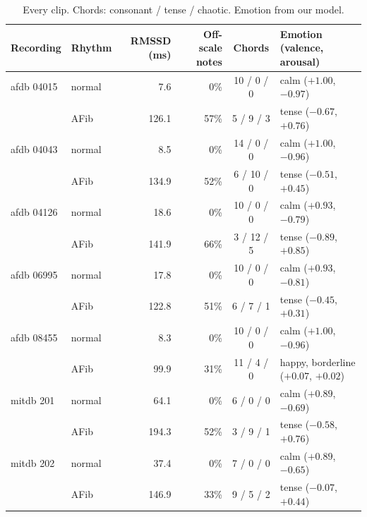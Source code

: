 \documentclass[11pt,a4paper]{article}
\begin{document}
\begin{table}[h]
\centering
\small
\setlength{\tabcolsep}{4pt}
\caption{Every clip. Chords: consonant / tense / chaotic. Emotion from our model.}
\label{tab:results}
\begin{tabular}{llrrcl}
\toprule
Recording & Rhythm & RMSSD (ms) & Off-scale notes & Chords & Emotion (valence, arousal)\\
\midrule
afdb 04015 & normal &   7.6 &  0\% & 10 / 0 / 0 & calm ($+1.00$, $-0.97$)\\
           & AFib   & 126.1 & 57\% &  5 / 9 / 3 & tense ($-0.67$, $+0.76$)\\
afdb 04043 & normal &   8.5 &  0\% & 14 / 0 / 0 & calm ($+1.00$, $-0.96$)\\
           & AFib   & 134.9 & 52\% & 6 / 10 / 0 & tense ($-0.51$, $+0.45$)\\
afdb 04126 & normal &  18.6 &  0\% & 10 / 0 / 0 & calm ($+0.93$, $-0.79$)\\
           & AFib   & 141.9 & 66\% & 3 / 12 / 5 & tense ($-0.89$, $+0.85$)\\
afdb 06995 & normal &  17.8 &  0\% & 10 / 0 / 0 & calm ($+0.93$, $-0.81$)\\
           & AFib   & 122.8 & 51\% &  6 / 7 / 1 & tense ($-0.45$, $+0.31$)\\
afdb 08455 & normal &   8.3 &  0\% & 10 / 0 / 0 & calm ($+1.00$, $-0.96$)\\
           & AFib   &  99.9 & 31\% & 11 / 4 / 0 & happy, borderline ($+0.07$, $+0.02$)\\
mitdb 201  & normal &  64.1 &  0\% &  6 / 0 / 0 & calm ($+0.89$, $-0.69$)\\
           & AFib   & 194.3 & 52\% &  3 / 9 / 1 & tense ($-0.58$, $+0.76$)\\
mitdb 202  & normal &  37.4 &  0\% &  7 / 0 / 0 & calm ($+0.89$, $-0.65$)\\
           & AFib   & 146.9 & 33\% &  9 / 5 / 2 & tense ($-0.07$, $+0.44$)\\
\bottomrule
\end{tabular}
\end{table}
\end{document}
